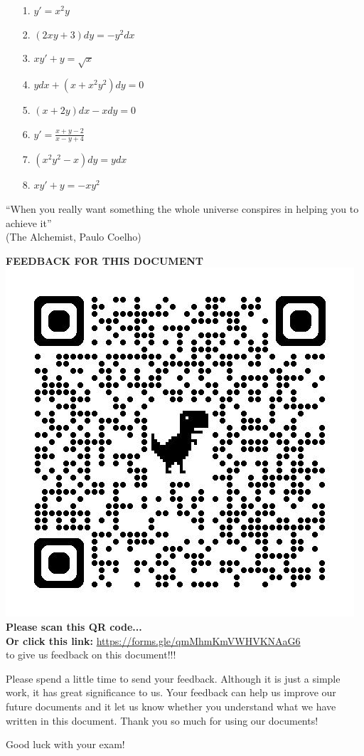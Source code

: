 \documentclass[12pt]{article}
\begin{document}
 \begin{multicols}{2}
\begin{enumerate}
    \item[1.] \( y' =x^2y \)
    \item[2.] \( (2xy +3)dy = -y^2dx \)
    \item[3.] \( xy' + y = \sqrt{x} \)
    \item[4.]\(ydx+(x+x^2y^2)dy=0\)
    \item[5.]\((x+2y)dx-xdy=0\) 
    \item[6.]\(y' =\displaystyle \frac{x+y-2}{x-y+4}\) 
    \item[7.]\((x^2y^2-x)dy=ydx\)
    \item[8.]\(xy'+y=-xy^2\) 
\end{enumerate}
\end{multicols}

\begin{center}
    “When you really want something the whole universe conspires in helping you to achieve it” \\
(The Alchemist, Paulo Coelho)
\end{center}
  
  \newpage
\begin{center}
    \textbf{FEEDBACK FOR THIS DOCUMENT}\\
    \includegraphics[width=0.5\linewidth]{qr.jpg}\\
    \textbf{Please scan this QR code...}\\
    \textbf{Or click this link:} \url{https://forms.gle/qmMhmKmVWHVKNAaG6} \\
    to give us feedback on this document!!!
\end{center}
Please spend a little time to send your feedback. Although it is just a simple work, it has great significance to us. Your feedback can help us improve our future documents and it let us know whether you understand what we have written in this document. Thank you so much for using our documents!\\
\begin{center}
    Good luck with your exam!
\end{center}
\end{document}
